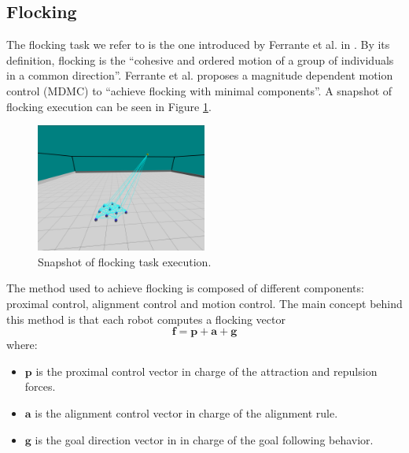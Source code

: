 \documentclass[../../Thesis.tex]{subfiles}
\begin{document}
		\subsection{Flocking}
		\label{sec:Flocking}%
			The flocking task we refer to is the one introduced by Ferrante et al. in \cite{Ferrante2012}. By its definition, flocking is the “cohesive and ordered motion of a group of individuals in a common direction”. Ferrante et al. proposes a magnitude dependent motion control (MDMC) to “achieve flocking with minimal components”. A snapshot of flocking execution can be seen in Figure \ref{fig:ARGoS_flocking}.\\
			\begin{figure}
			    \centering
			    \includegraphics[width=0.5\textwidth]{../../Images/Data_collection/ARGoS_flocking_snapshot.png}
			    \caption{Snapshot of flocking task execution.}
			    \label{fig:ARGoS_flocking}
			\end{figure}
			The method used to achieve flocking is composed of different components: proximal control, alignment control and motion control. The main concept behind this method is that each robot computes a flocking vector
			\[\mathbf{f} = \mathbf{p} + \mathbf{a} + \mathbf{g}\]
			where:
			\begin{itemize}
				\item $\mathbf{p}$ is the proximal control vector in charge of the attraction and repulsion forces.
				\item $\mathbf{a}$ is the alignment control vector in charge of the alignment rule.
				\item $\mathbf{g}$ is the goal direction vector in in charge of the goal following behavior.
			\end{itemize}
\end{document}
